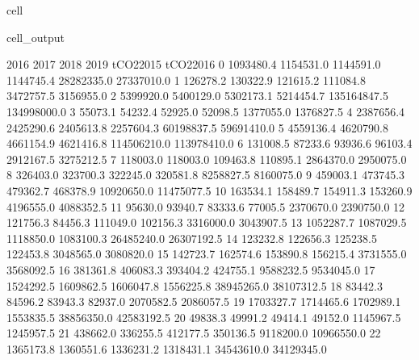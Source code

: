 \documentclass[letterpaper,10pt,english]{jupyterBook}
\begin{document}
\begin{sphinxuseclass}{cell}
\begin{sphinxVerbatimOutput}
\begin{sphinxuseclass}{cell_output}
\begin{sphinxVerbatim}[commandchars=\\\{\}]
         2016       2017       2018       2019    tCO2\PYGZus{}2015    tCO2\PYGZus{}2016  \PYGZbs{}
0   1093480.4  1154531.0  1144591.0  1144745.4   28282335.0   27337010.0   
1    126278.2   130322.9   121615.2   111084.8    3472757.5    3156955.0   
2   5399920.0  5400129.0  5302173.1  5214454.7  135164847.5  134998000.0   
3     55073.1    54232.4    52925.0    52098.5    1377055.0    1376827.5   
4   2387656.4  2425290.6  2405613.8  2257604.3   60198837.5   59691410.0   
5   4559136.4  4620790.8  4661154.9  4621416.8  114506210.0  113978410.0   
6    131008.5    87233.6    93936.6    96103.4    2912167.5    3275212.5   
7    118003.0   118003.0   109463.8   110895.1    2864370.0    2950075.0   
8    326403.0   323700.3   322245.0   320581.8    8258827.5    8160075.0   
9    459003.1   473745.3   479362.7   468378.9   10920650.0   11475077.5   
10   163534.1   158489.7   154911.3   153260.9    4196555.0    4088352.5   
11    95630.0    93940.7    83333.6    77005.5    2370670.0    2390750.0   
12   121756.3    84456.3   111049.0   102156.3    3316000.0    3043907.5   
13  1052287.7  1087029.5  1118850.0  1083100.3   26485240.0   26307192.5   
14   123232.8   122656.3   125238.5   122453.8    3048565.0    3080820.0   
15   142723.7   162574.6   153890.8   156215.4    3731555.0    3568092.5   
16   381361.8   406083.3   393404.2   424755.1    9588232.5    9534045.0   
17  1524292.5  1609862.5  1606047.8  1556225.8   38945265.0   38107312.5   
18    83442.3    84596.2    83943.3    82937.0    2070582.5    2086057.5   
19  1703327.7  1714465.6  1702989.1  1553835.5   38856350.0   42583192.5   
20    49838.3    49991.2    49414.1    49152.0    1145967.5    1245957.5   
21   438662.0   336255.5   412177.5   350136.5    9118200.0   10966550.0   
22  1365173.8  1360551.6  1336231.2  1318431.1   34543610.0   34129345.0   


\end{sphinxVerbatim}
\end{sphinxuseclass}
\end{sphinxVerbatimOutput}
\end{sphinxuseclass}
\end{document}
